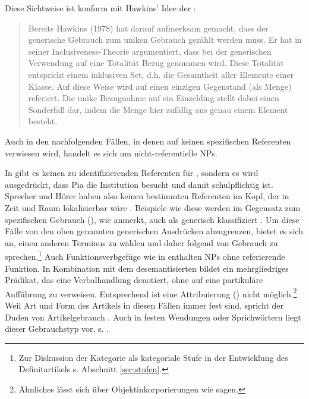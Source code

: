 Diese Sichtweise ist konform mit Hawkins' Idee der :  \blockcquote[43]{Studler2011}{Bereits Hawkins (1978) hat darauf aufmerksam gemacht, dass der generische Gebrauch zum uniken Gebrauch gezählt werden muss. Er hat in seiner Inclusiveness-Theorie argumentiert, dass bei der generischen Verwendung auf eine Totalität Bezug genommen wird. Diese Totalität entspricht einem inklusiven Set, d.h. die Gesamtheit
aller Elemente einer Klasse. Auf diese Weise wird auf einen einzigen Gegenstand (als
Menge) referiert. Die unike Bezugnahme auf ein Einzelding stellt dabei einen Sonderfall
dar, indem die Menge hier zufällig aus genau einem Element besteht.} 



Auch in den nachfolgenden Fällen, in denen  auf keinen spezifischen Referenten verwiesen wird, handelt es sich um nicht-referentielle NPs. 

\begin{exe}
	\ex \label{ex:nonref}   
	\begin{xlist}
		\ex \label{ex:schule-pia}  
		\ex \label{ex:fvg} 
		\end{xlist}
\end{exe}
\noindent 
In  gibt es keinen zu identifizierenden Referenten für , sondern es wird ausgedrückt, dass Pia die Institution  besucht und damit schulpflichtig ist. Sprecher und Hörer haben also keinen bestimmten Referenten im Kopf, der in Zeit und Raum lokalisierbar wäre \parencite[40]{Bisle-Muller1991}. Beispiele wie diese werden im Gegensatz zum spezifischen Gebrauch (), wie \textcite[245]{Studler2011} anmerkt, auch als generisch klassifiziert \parencite[ähnlich][90]{Szczepaniak2011a}. Um diese Fälle von den oben genannten generischen Ausdrücken abzugrenzen, bietet es sich an, einen anderen Terminus zu wählen und daher \textcite[54]{Bisle-Muller1991} folgend von  Gebrauch zu sprechen.\footnote{Zur Diskussion der Kategorie  als kategoriale Stufe in der Entwicklung des Definitartikels s. Abschnitt \ref{sec:stufen}.} Auch Funktionsverbgefüge wie in  enthalten NPs ohne referierende Funktion. In Kombination mit dem desemantisierten  bildet  ein mehrgliedriges Prädikat, das eine Verbalhandlung denotiert, ohne auf eine partikuläre Aufführung zu verweisen. Entsprechend ist eine Attribuierung () nicht möglich.\footnote{Ähnliches lässt sich über Objektinkorporierungen wie  sagen.} Weil Art und Form des Artikels in diesen Fällen immer fest sind, spricht der Duden von  Artikelgebrauch \parencite[297f.]{Duden2009}. Auch in festen Wendungen oder Sprichwörtern liegt dieser Gebrauchstyp vor, s.   \parencite[298]{Duden2009}.  

